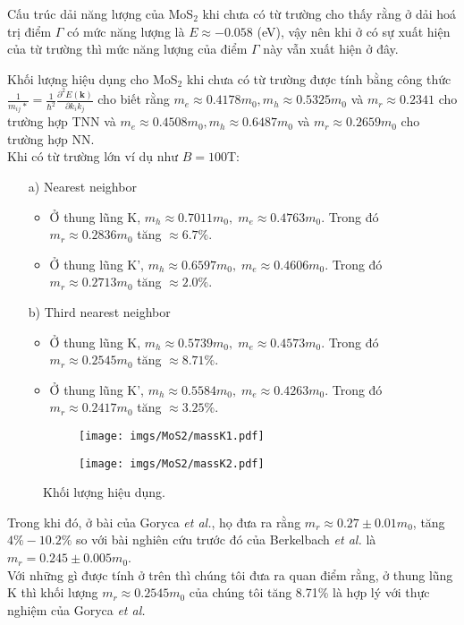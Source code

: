 \documentclass{article}
\begin{document}
Cấu trúc dải năng lượng của MoS$_{2}$ khi chưa có từ trường cho thấy rằng ở dải hoá trị điểm $\Gamma$ có mức năng lượng là $E \approx -0.058$ (eV), vậy nên khi ở có sự xuất hiện của từ trường thì mức năng lượng của điểm $\Gamma$ này vẫn xuất hiện ở đây. 

Khối lượng hiệu dụng cho MoS$_{2}$ khi chưa có từ trường được tính bằng công thức $\frac{1}{m_{ij}*} =\frac{1}{\hbar^{2}} \frac{\partial^{2} E(\mathbf{k})}{\partial k_{i} k_{j}}$ cho biết rằng $m_{e} \approx 0.4178 m_{0}, m_{h} \approx 0.5325 m_{0}$ và $m_{r} \approx 0.2341$ cho trường hợp TNN và $m_{e} \approx 0.4508 m_{0}, m_{h} \approx 0.6487 m_{0}$ và $m_{r} \approx 0.2659m_{0}$ cho trường hợp NN. \\
Khi có từ trường lớn ví dụ như $B = 100 $T:
\begin{itemize}
	\item[a)] Nearest neighbor
	\begin{itemize}
		\item Ở thung lũng K, $m_{h} \approx 0.7011 m_{0},\; m_{e} \approx 0.4763 m_{0}$. 
		Trong đó $m_{r} \approx 0.2836 m_{0}$ tăng $\approx 6.7\%$.
		
		\item Ở thung lũng K', $m_{h} \approx 0.6597 m_{0},\; m_{e} \approx 0.4606 m_{0}$. 
		Trong đó $m_{r} \approx 0.2713 m_{0}$ tăng $\approx 2.0\%$.
	\end{itemize}
	\item[b)] Third nearest neighbor
	\begin{itemize}
		\item Ở thung lũng K, $m_{h} \approx 0.5739 m_{0},\; m_{e} \approx 0.4573 m_{0}$. 
		Trong đó $m_{r} \approx 0.2545 m_{0}$ tăng $\approx 8.71\%$.
		
		\item Ở thung lũng K', $m_{h} \approx 0.5584 m_{0},\; m_{e} \approx 0.4263 m_{0}$. 
		Trong đó $m_{r} \approx 0.2417 m_{0}$ tăng $\approx 3.25\%$.
	\end{itemize}
\end{itemize}

\begin{figure}[htb]
	\begin{subfigure}{0.495\textwidth}
		\centering
		\texttt{[image: imgs/MoS2/massK1.pdf]}
	\end{subfigure}
	\begin{subfigure}{0.495\textwidth}
		\centering
		\texttt{[image: imgs/MoS2/massK2.pdf]}
	\end{subfigure}
	\caption{Khối lượng hiệu dụng.}
\end{figure}
Trong khi đó, ở bài của Goryca \textit{et al.}\cite{goryca2019}, họ đưa ra rằng $m_{r} \approx 0.27 \pm 0.01 m_{0}$, tăng $4\%-10.2\%$ so với bài nghiên cứu trước đó của Berkelbach \textit{et al.} \cite{berkelbach2013} là $m_{r} = 0.245 \pm 0.005 m_{0}$.\\
Với những gì được tính ở trên thì chúng tôi đưa ra quan điểm rằng, ở thung lũng K thì khối lượng $m_{r} \approx 0.2545 m_{0}$ của chúng tôi tăng 8.71\% là hợp lý với thực nghiệm của Goryca \textit{et al.}
\end{document}
